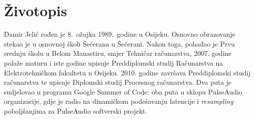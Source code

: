 \newpage

\chapter*{Životopis}

Damir Jelić rođen je 8.~ožujka 1989.~godine u Osijeku. Osnovno
obrazovanje stekao je u osnovnoj školi Šećerana u Šećerani. Nakon toga,
pohađao je Prvu srednju školu u Belom Manastiru, smjer Tehničar računarstva,
2007. godine polaže maturu i iste godine upisuje Preddiplomski studij
Računarstva na Elektrotehničkom fakultetu u Osijeku. 2010. godine završava
Preddiplomski studij računarstva te upisuje Diplomski studij Procesnog
računarstva. Dva puta je sudjelovao u programu Google Summer of Code: oba puta u
sklopu PulseAudio organizacije, gdje je radio na dinamičkom podešavanju latencije
i \emph{resampling} poboljšanjima za PulseAudio softverski projekt.

\vspace{1cm}
\noindent \vspace*{1.0cm} \makebox[1.5in]{\hrulefill}
